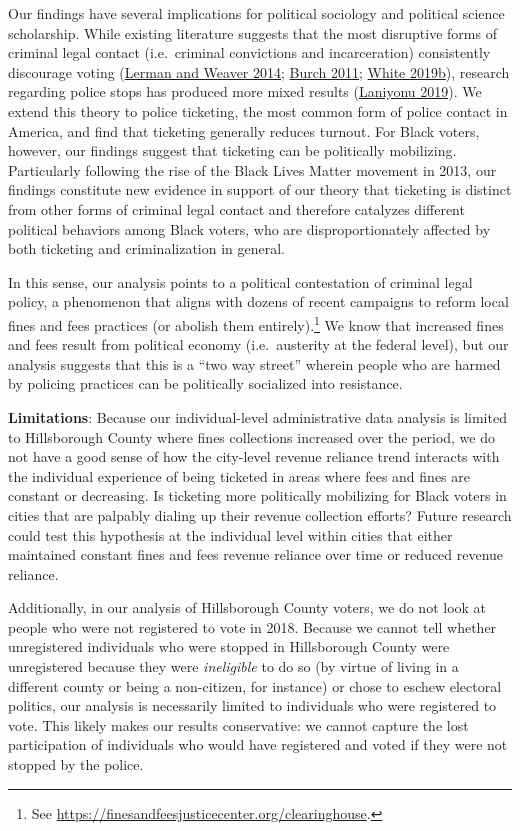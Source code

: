 \documentclass[
  12pt,
]{article}
\begin{document}
Our findings have several implications for political sociology and political science scholarship. While existing literature suggests that the most disruptive forms of criminal legal contact (i.e.~criminal convictions and incarceration) consistently discourage voting (\protect\hyperlink{ref-Lerman2014}{Lerman and Weaver 2014}; \protect\hyperlink{ref-Burch2011}{Burch 2011}; \protect\hyperlink{ref-White2019a}{White 2019b}), research regarding police stops has produced more mixed results (\protect\hyperlink{ref-Laniyonu2019}{Laniyonu 2019}). We extend this theory to police ticketing, the most common form of police contact in America, and find that ticketing generally reduces turnout. For Black voters, however, our findings suggest that ticketing can be politically mobilizing. Particularly following the rise of the Black Lives Matter movement in 2013, our findings constitute new evidence in support of our theory that ticketing is distinct from other forms of criminal legal contact and therefore catalyzes different political behaviors among Black voters, who are disproportionately affected by both ticketing and criminalization in general.

In this sense, our analysis points to a political contestation of criminal legal policy, a phenomenon that aligns with dozens of recent campaigns to reform local fines and fees practices (or abolish them entirely).\footnote{See \url{https://finesandfeesjusticecenter.org/clearinghouse}.} We know that increased fines and fees result from political economy (i.e.~austerity at the federal level), but our analysis suggests that this is a ``two way street'' wherein people who are harmed by policing practices can be politically socialized into resistance.

\textbf{Limitations}: Because our individual-level administrative data analysis is limited to Hillsborough County where fines collections increased over the period, we do not have a good sense of how the city-level revenue reliance trend interacts with the individual experience of being ticketed in areas where fees and fines are constant or decreasing. Is ticketing more politically mobilizing for Black voters in cities that are palpably dialing up their revenue collection efforts? Future research could test this hypothesis at the individual level within cities that either maintained constant fines and fees revenue reliance over time or reduced revenue reliance.

Additionally, in our analysis of Hillsborough County voters, we do not look at people who were not registered to vote in 2018. Because we cannot tell whether unregistered individuals who were stopped in Hillsborough County were unregistered because they were \emph{ineligible} to do so (by virtue of living in a different county or being a non-citizen, for instance) or chose to eschew electoral politics, our analysis is necessarily limited to individuals who were registered to vote. This likely makes our results conservative: we cannot capture the lost participation of individuals who would have registered and voted if they were not stopped by the police.
\end{document}
